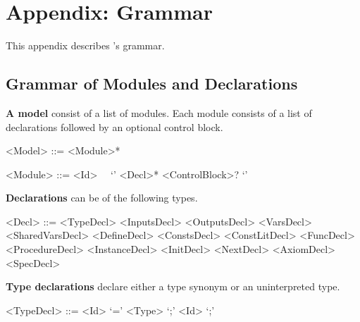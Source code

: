 \chapter{Appendix: \uclid{} Grammar}

\newcommand{\paratitle}[1]{\textsf{\textbf{#1}}}
\newcommand{\nonterminal}[1]{$\langle \textit{#1} \rangle$}

\setlength{\grammarindent}{12em} %

This appendix describes \uclid{}'s grammar.

\section{Grammar of Modules and Declarations}
\paratitle{A model} consist of a list of modules. Each module consists of a list of declarations followed by an optional control block.
\begin{grammar}
     <Model> ::= <Module>*

     <Module> ::=  <Id>~~ `{' <Decl>* <ControlBlock>? `}'
\end{grammar}

\paratitle{Declarations} can be of the following types.
\begin{grammar}
     <Decl> ::= <TypeDecl> 
            \alt <InputsDecl> 
            \alt <OutputsDecl> 
            \alt <VarsDecl> 
            \alt <SharedVarsDecl> 
            \alt <DefineDecl>
            \alt <ConstsDecl> 
            \alt <ConstLitDecl>
            \alt <FuncDecl> 
            \alt <ProcedureDecl> 
            \alt <InstanceDecl>
            \alt <InitDecl> 
            \alt <NextDecl> 
            \alt <AxiomDecl>
            \alt <SpecDecl> 
\end{grammar}

\paratitle{Type declarations} declare either a type synonym or an uninterpreted type.
\begin{grammar}
     <TypeDecl> ::=  <Id> `=' <Type> `;'
              \alt {} <Id> `;'

\end{grammar}

